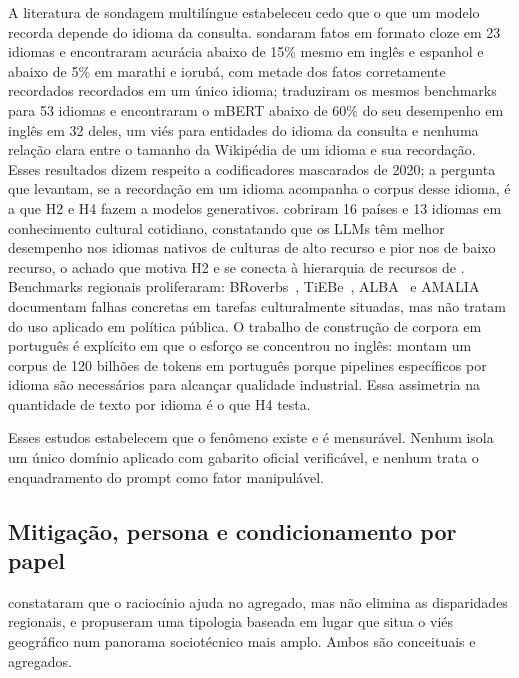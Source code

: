 A literatura de sondagem multilíngue estabeleceu cedo que o que um modelo
recorda depende do idioma da consulta. \citet{jiang2020xfactr} sondaram fatos
em formato cloze em 23 idiomas e encontraram acurácia abaixo de 15\% mesmo em
inglês e espanhol e abaixo de 5\% em marathi e iorubá, com metade dos fatos
corretamente recordados recordados em um único idioma; \citet{kassner2021mlama}
traduziram os mesmos benchmarks para 53 idiomas e encontraram o mBERT abaixo
de 60\% do seu desempenho em inglês em 32 deles, um viés para entidades do
idioma da consulta e nenhuma relação clara entre o tamanho da Wikipédia de um
idioma e sua recordação. Esses resultados dizem respeito a codificadores
mascarados de 2020; a pergunta que levantam, se a recordação em um idioma
acompanha o corpus desse idioma, é a que H2 e H4 fazem a modelos generativos.
\citet{myung2024blend} cobriram 16 países e 13 idiomas em conhecimento
cultural cotidiano, constatando que os LLMs têm melhor desempenho
nos idiomas nativos de culturas de alto recurso e pior nos de baixo recurso, o
achado que motiva H2 e se conecta à hierarquia de recursos de
\citet{joshi2020state}. Benchmarks regionais proliferaram:
BRoverbs~\citep{broverbs2025}, TiEBe~\citep{almeida2025tiebe},
ALBA~\citep{alba2026} e AMALIA~\citep{amalia2026} documentam falhas concretas
em tarefas culturalmente situadas, mas não tratam do uso aplicado em política
pública. O trabalho de construção de corpora em português é explícito em que o
esforço se concentrou no inglês: \citet{almeida2025portuguese} montam um corpus
de 120 bilhões de tokens em português porque pipelines específicos por idioma
são necessários para alcançar qualidade industrial. Essa assimetria na
quantidade de texto por idioma é o que H4 testa.

Esses estudos estabelecem que o fenômeno existe e é mensurável. Nenhum isola um
único domínio aplicado com gabarito oficial verificável, e nenhum trata o
enquadramento do prompt como fator manipulável.

\subsection{Mitigação, persona e condicionamento por papel}

\citet{opuszko2026unraveling} constataram que o raciocínio ajuda no agregado,
mas não elimina as disparidades regionais, e \citet{kerche2026silicon}
propuseram uma tipologia baseada em lugar que situa o viés geográfico num
panorama sociotécnico mais amplo. Ambos são conceituais e agregados.

